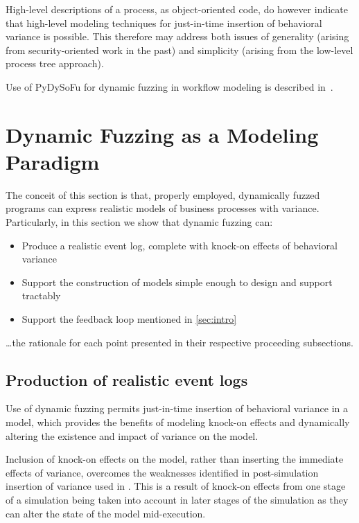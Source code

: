 \documentclass[draft,12pt]{llncs}  %
\begin{document}
High-level descriptions of a process, as object-oriented code, do however
indicate that high-level modeling techniques for just-in-time insertion of
behavioral variance is possible. This therefore may address both issues of
generality (arising from security-oriented work in the past) and simplicity
(arising from the low-level process tree approach).
\par

Use of PyDySoFu for dynamic fuzzing in
workflow modeling is described in~\cite{wallis2018modelling}.
\par

\section{Dynamic Fuzzing as a Modeling Paradigm}
\label{sec:dynamic_fuzzing_benefits}
The conceit of this section is that, properly employed, dynamically fuzzed
programs can express realistic models of business processes with variance.
Particularly, in this section we show that dynamic fuzzing can:

\begin{itemize}
\item Produce a realistic event log, complete with knock-on effects of
  behavioral variance
\item Support the construction of models simple enough to design and support
  tractably
\item Support the feedback loop mentioned in \cref{sec:intro}
\end{itemize}

\ldots{}the rationale for each point presented in their respective proceeding
subsections.

\subsection{Production of realistic event logs}
Use of dynamic fuzzing permits just-in-time insertion of behavioral variance in
a model, which provides the benefits of modeling knock-on effects and
dynamically altering the existence and impact of variance on the model.
\par

Inclusion of knock-on effects on the model, rather than inserting the immediate
effects of variance, overcomes the weaknesses identified in post-simulation
insertion of variance used in \cite{accorsi2013secsy}. This is a result of
knock-on effects from one stage of a simulation being taken into account in
later stages of the simulation as they can alter the state of the model
mid-execution.
\par
\end{document}
